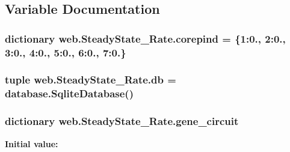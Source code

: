 \subsection{Variable Documentation}
\hypertarget{namespaceweb_1_1_steady_state___rate_ac658de5480a1725ee5f7188e37d3c9e3}{
\subsubsection[{corepind}]{\setlength{\rightskip}{0pt plus 5cm}dictionary web.\-Steady\-State\-\_\-\-Rate.\-corepind = \{1\-:0., 2\-:0., 3\-:0., 4\-:0., 5\-:0., 6\-:0., 7\-:0.\}}}\label{namespaceweb_1_1_steady_state___rate_ac658de5480a1725ee5f7188e37d3c9e3}
\hypertarget{namespaceweb_1_1_steady_state___rate_a531f9391907dcb2ec8d4bd2097e49587}{
\subsubsection[{db}]{\setlength{\rightskip}{0pt plus 5cm}tuple web.\-Steady\-State\-\_\-\-Rate.\-db = {\bf database.\-Sqlite\-Database}()}}\label{namespaceweb_1_1_steady_state___rate_a531f9391907dcb2ec8d4bd2097e49587}
\hypertarget{namespaceweb_1_1_steady_state___rate_a3635765778627d1b462180a128f69c89}{
\subsubsection[{gene\-\_\-circuit}]{\setlength{\rightskip}{0pt plus 5cm}dictionary web.\-Steady\-State\-\_\-\-Rate.\-gene\-\_\-circuit}}\label{namespaceweb_1_1_steady_state___rate_a3635765778627d1b462180a128f69c89}
{\bfseries Initial value\-:}
